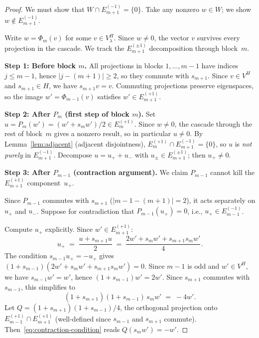 \documentclass[11pt]{article}
\theoremstyle{definition}
\theoremstyle{remark}
\begin{document}
\begin{proof}
We must show that $W \cap E_{m+1}^{(-1)} = \{0\}$.
Take any nonzero $w \in W$; we show $w \notin E_{m+1}^{(-1)}$.

Write $w = \Phi_m(v)$ for some $v \in V_\lambda^H$.
Since $w \ne 0$, the vector $v$ survives every projection
in the cascade. We track the $E_{m+1}^{(\pm 1)}$ decomposition
through block~$m$.

\medskip\noindent\textbf{Step 1: Before block $m$.}
All projections in blocks $1, \ldots, m{-}1$ have indices
$j \le m{-}1$, hence $|j - (m{+}1)| \ge 2$, so they commute
with $s_{m+1}$. Since $v \in V^H$ and $s_{m+1} \in H$, we have
$s_{m+1} v = v$. Commuting projections preserve eigenspaces,
so the image $w' = \Phi_{m-1}(v)$ satisfies
$w' \in E_{m+1}^{(+1)}$.

\medskip\noindent\textbf{Step 2: After $P_m$ (first step of block $m$).}
Set $u = P_m(w') = (w' + s_m w')/2 \in E_m^{(+1)}$.
Since $w \ne 0$, the cascade through the rest of block~$m$
gives a nonzero result, so in particular $u \ne 0$.
By Lemma~\ref{lem:adjacent} (adjacent disjointness),
$E_m^{(+1)} \cap E_{m+1}^{(-1)} = \{0\}$, so $u$ is
\emph{not purely} in $E_{m+1}^{(-1)}$.
Decompose $u = u_+ + u_-$ with $u_\pm \in E_{m+1}^{(\pm 1)}$;
then $u_+ \ne 0$.

\medskip\noindent\textbf{Step 3: After $P_{m-1}$ (contraction argument).}
We claim $P_{m-1}$ cannot kill the $E_{m+1}^{(+1)}$
component~$u_+$.

Since $P_{m-1}$ commutes with $s_{m+1}$ ($|m{-}1 - (m{+}1)| = 2$),
it acts separately on $u_+$ and $u_-$.
Suppose for contradiction that $P_{m-1}(u_+) = 0$,
i.e., $u_+ \in E_{m-1}^{(-1)}$.

Compute $u_+$ explicitly. Since $w' \in E_{m+1}^{(+1)}$:
\[
  u_+ \;=\; \frac{u + s_{m+1} u}{2}
      \;=\; \frac{2w' + s_m w' + s_{m+1} s_m w'}{4}.
\]
The condition $s_{m-1} u_+ = -u_+$ gives
$(1 + s_{m-1})(2w' + s_m w' + s_{m+1} s_m w') = 0$.
Since $m{-}1$ is odd and $w' \in V^H$, we have
$s_{m-1} w' = w'$, hence $(1 + s_{m-1})w' = 2w'$.
Since $s_{m+1}$ commutes with $s_{m-1}$, this simplifies to
\begin{equation}\label{eq:contraction-condition}
  (1 + s_{m+1})(1 + s_{m-1})\, s_m w' \;=\; -4w'.
\end{equation}
Let $Q = (1 + s_{m+1})(1 + s_{m-1})/4$, the orthogonal projection
onto $E_{m-1}^{(+1)} \cap E_{m+1}^{(+1)}$
(well-defined since $s_{m-1}$ and $s_{m+1}$ commute).
Then~\eqref{eq:contraction-condition} reads
$Q(s_m w') = -w'$.


\end{proof}
\end{document}
